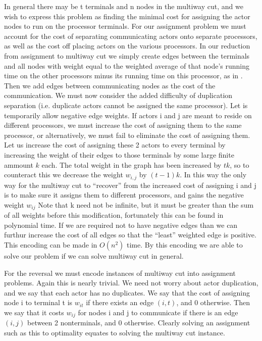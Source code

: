 In general there may be t terminals and n nodes in the multiway cut, and we wish to express this problem as finding the minimal cost for assigning the actor nodes to run on the processor terminals.
For our assignment problem we must account for the cost of separating communicating actors onto separate processors, as well as the cost off placing actors on the various processors.
In our reduction from assignment to multiway cut we simply create edges between the terminals and all nodes with weight equal to the weighted average of that node's running time on the other processors minus its running time on this processor, as in \cite{sto77}.
Then we add edges between communicating nodes as the cost of the communication.
We must now consider the added difficulty of duplication separation (i.e. duplicate actors cannot be assigned the same processor).
Let is temporarily allow negative edge weights.
If actors i and j are meant to reside on different processors, we must increase the cost of assigning them to the same processor, or alternatively, we must fail to eliminate the cost of assigning them.
Let us increase the cost of assigning these 2 actors to every terminal by increasing the weight of their edges to those terminals by some large finite ammount $k$ each.
The total weight in the graph has been increased by $tk$, so to counteract this we decrease the weight $w_{i,j}$ by $(t-1)k$.
In this way the only way for the multiway cut to ``recover'' from the increased cost of assigning i and j is to make sure it assigns them to different processors, and gains the negative weight $w_{ij}$
Note that k need not be infinite, but it must be greater than the sum of all weights before this modification, fortunately this can be found in polynomial time.
If we are required not to have negative edges than we can furthur increase the cost of all edges so that the ``least'' weighted edge is positive.
This encoding can be made in $O(n^2)$ time.
By this encoding we are able to solve our problem if we can solve multiway cut in general.

For the reversal we must encode instances of multiway cut into assignment problems.
Again this is nearly trivial.
We need not worry about actor duplication, and we say that each actor has no duplicates.
We say that the cost of assigning node i to terminal t is $w_{it}$ if there exists an edge $(i,t)$, and 0 otherwise.
Then we say that it costs $w_{ij}$ for nodes i and j to communicate if there is an edge $(i,j)$ between 2 nonterminals, and 0 otherwise.
Clearly solving an assignment such as this to optimality equates to solving the multiway cut instance.

